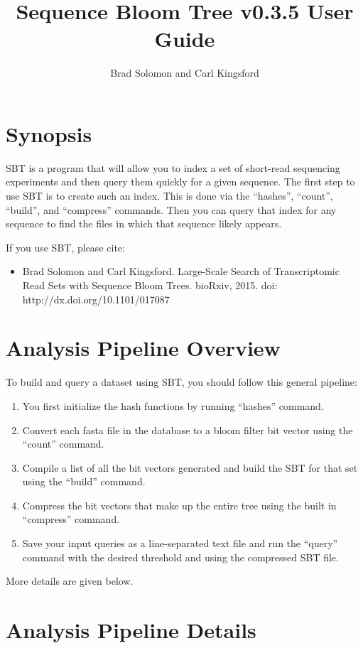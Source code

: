 \documentclass{article}
\title{Sequence Bloom Tree v0.3.5 User Guide}
\author{Brad Solomon and Carl Kingsford}
\begin{document}
\maketitle

\section{Synopsis}

SBT is a program that will allow you to index a set of short-read sequencing experiments and then query them quickly for a given sequence. The first step to use SBT is to create such an index. This is done via the ``hashes'', ``count'',  ``build'', and ``compress'' commands. Then you can query that index for any sequence to find the files in which that sequence likely appears.

If you use SBT, please cite:
\begin{itemize}
\item Brad Solomon and Carl Kingsford.
Large-Scale Search of Transcriptomic Read Sets with Sequence Bloom Trees. 
bioRxiv, 2015. doi: http://dx.doi.org/10.1101/017087
\end{itemize}

\section{Analysis Pipeline Overview}

To build and query a dataset using SBT, you should follow this general pipeline:
\begin{enumerate}
\item You first initialize the hash functions by running ``hashes'' command. 
\item Convert each fasta file in the database to a bloom filter bit vector using the  ``count'' command. 
\item Compile a list of all the bit vectors generated and build the SBT for that set using the ``build'' command.
\item Compress the bit vectors that make up the entire tree using the built in ``compress'' command.
\item Save your input queries as a line-separated text file and run the ``query'' command with the desired threshold and using the compressed SBT file.
\end{enumerate}
More details are given below.

\section{Analysis Pipeline Details}
\end{document}
